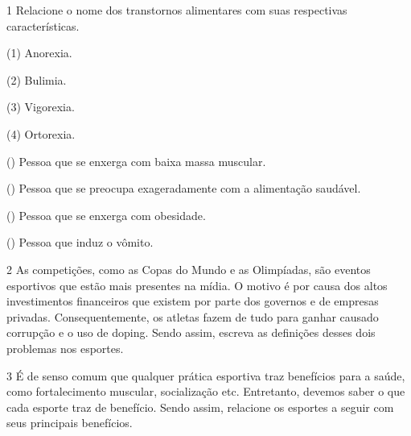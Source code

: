 
\num{1}  Relacione o nome dos transtornos alimentares com suas respectivas características.

\begin{multicols}{2}

(1) Anorexia.

(2) Bulimia.

(3) Vigorexia.

(4) Ortorexia.

\columnbreak

() Pessoa que se enxerga com baixa massa muscular.

() Pessoa que se preocupa exageradamente com a alimentação saudável.

() Pessoa que se enxerga com obesidade.

() Pessoa que induz o vômito.
\end{multicols}


\num{2} As competições, como as Copas do Mundo e as Olimpíadas, são eventos esportivos que estão mais presentes na mídia. O motivo é por causa dos altos investimentos financeiros que existem por parte dos governos e de empresas privadas. Consequentemente, os atletas fazem de tudo para ganhar causado corrupção e o uso de doping. Sendo assim, escreva as definições desses dois problemas nos esportes.



\num{3} É de senso comum que qualquer prática esportiva traz benefícios para a saúde, como fortalecimento muscular, socialização etc. Entretanto, devemos saber o que cada esporte traz de benefício. Sendo assim, relacione os esportes a seguir com seus principais benefícios.

